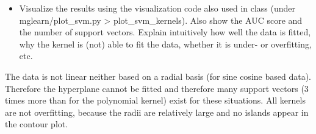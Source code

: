 \documentclass[11pt]{article}
\providecommand{\tightlist}{%
      \setlength{\itemsep}{0pt}\setlength{\parskip}{0pt}}
\begin{document}
\begin{itemize}
\tightlist
\item
  Visualize the results using the visualization code also used in class
  (under mglearn/plot\_svm.py \textgreater{} plot\_svm\_kernels). Also
  show the AUC score and the number of support vectors. Explain
  intuitively how well the data is fitted, why the kernel is (not) able
  to fit the data, whether it is under- or overfitting, etc.
\end{itemize}

The data is not linear neither based on a radial basis (for sine cosine
based data). Therefore the hyperplane cannot be fitted and therefore
many support vectors (3 times more than for the polynomial kernel) exist
for these situations. All kernels are not overfitting, because the radii
are relatively large and no islands appear in the contour plot.
\end{document}
